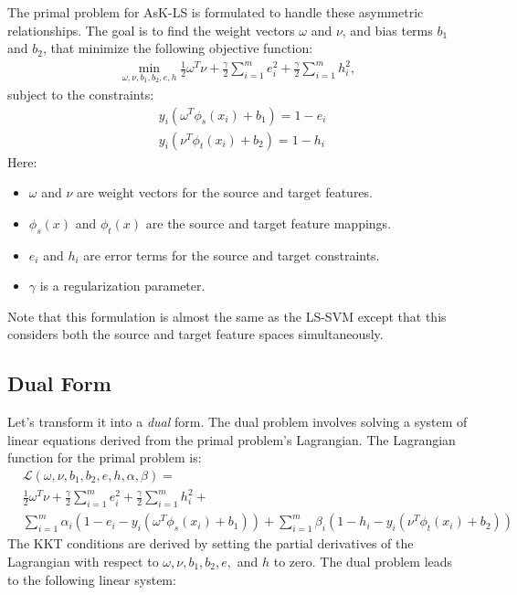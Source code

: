 The primal problem for AsK-LS is formulated to handle these asymmetric relationships. The goal is to find the weight vectors \( \omega \) and \( \nu \), and bias terms \( b_1 \) and \( b_2 \), that minimize the following objective function:
\begin{align*}
	\min_{\omega, \nu, b_1, b_2, e, h} \frac{1}{2} \omega^T \nu + \frac{\gamma}{2} \sum_{i=1}^m e_i^2 + \frac{\gamma}{2} \sum_{i=1}^m h_i^2, 
\end{align*}
subject to the constraints:
\begin{align*}
	& y_i (\omega^T \phi_s(x_i) + b_1) = 1 - e_i\\
	& y_i (\nu^T \phi_t(x_i) + b_2) = 1 - h_i
\end{align*}
Here:
\begin{itemize}
	\item \( \omega \) and \( \nu \) are weight vectors for the source and target features.
	\item \( \phi_s(x) \) and \( \phi_t(x) \) are the source and target feature mappings.
	\item \( e_i \) and \( h_i \) are error terms for the source and target constraints.
	\item \( \gamma \) is a regularization parameter.
\end{itemize}
Note that this formulation is almost the same as the LS-SVM except that this considers both the source and target feature spaces simultaneously.

\subsection{Dual Form}
Let's transform it into a \textit{dual} form. The dual problem involves solving a system of linear equations derived from the primal problem's Lagrangian. The Lagrangian function for the primal problem is:
\begin{align*}
	&\mathcal{L}( \omega, \nu, b_1, b_2, e, h, \alpha, \beta) = \\
	&\frac{1}{2} \omega^T \nu + \frac{\gamma}{2} \sum_{i=1}^m e_i^2 + \frac{\gamma}{2} \sum_{i=1}^m h_i^2+ \\& \sum_{i=1}^m \alpha_i (1 - e_i - y_i (\omega^T \phi_s(x_i) + b_1)) + \sum_{i=1}^m \beta_i (1 - h_i - y_i (\nu^T \phi_t(x_i) + b_2))
\end{align*}
The KKT conditions are derived by setting the partial derivatives of the Lagrangian with respect to \( \omega, \nu, b_1, b_2, e, \) and \( h \) to zero. The dual problem leads to the following linear system:

